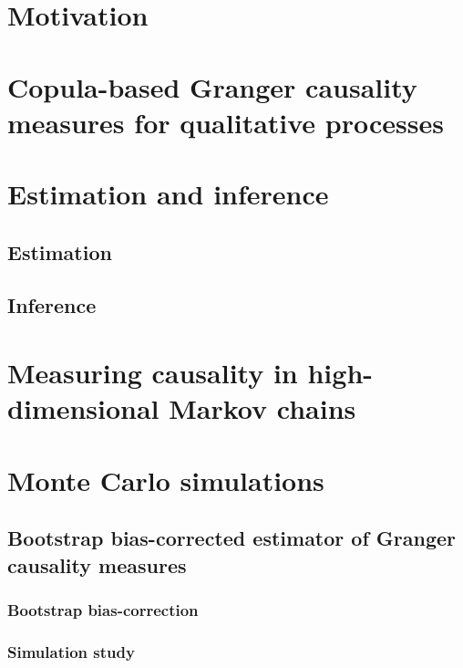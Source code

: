 \documentclass[harvard,11pt]{article}
\begin{document}
\section{Motivation \label{Motivation}}

\section{Copula-based Granger causality measures for qualitative processes \label{Copula-based Granger causality measures for qualitative processes}}

\section{Estimation and inference \label{Estimation and inference}}

\subsection{Estimation \label{Estimation}}

\subsection{Inference \label{Inference}}

\section{Measuring causality in high-dimensional Markov chains \label{Measuring causality in high-dimensional Markov chains}}
\section{Monte Carlo simulations \label{Monte Carlo simulations}}

\subsection{Bootstrap bias-corrected estimator of Granger causality measures \label{Bootstrap bias-corrected estimator of Granger causality measures}}

\subsubsection{Bootstrap bias-correction \label{Bootstrap bias-correction}}

\subsubsection{Simulation study \label{Simulation study}}
\end{document}

